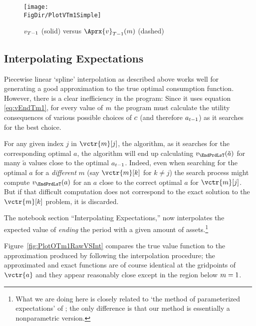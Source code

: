 \hypertarget{PlotvTm1Simple}{}
\begin{figure}
  \centerline{\texttt{[image: \\FigDir/PlotVTm1Simple]}}
  \caption{$v_{T-1}$ (solid) versus $\Aprx{\vFunc}_{\trmT-1}(\mNrm)$ (dashed)}
  \label{fig:PlotVTm1Simple}
\end{figure}


\hypertarget{interpolating-expectations}{}
\subsection{Interpolating Expectations}


Piecewise linear `spline' interpolation as described above works well for generating a good approximation to the true optimal consumption function. However, there is a clear inefficiency in the program: Since it uses equation \eqref{eq:vEndTm1}, for every value of $m$ the program must calculate the utility consequences of various possible choices of $c$ (and therefore $a_{t-1}$) as it searches for the best choice.

For any given index $j$ in $\vctr{m}[j]$, the algorithm, as it searches for the corresponding optimal $a$, the algorithm will end up  calculating $\vFunc_{\EndPrdLsT}(\tilde{a})$ for many $\tilde{a}$ values close to the optimal ${a}_{t-1}$.  Indeed, even when searching for the optimal ${a}$ for a \emph{different} ${m}$ (say $\vctr{m}[k]$ for $k \neq j$) the search process might compute $\vFunc_{\EndPrdLsT}({a})$ for an ${a}$ close to the correct optimal ${a}$ for $\vctr{m}[j]$. But if that difficult computation does not correspond to the exact solution to the $\vctr{m}[k]$ problem, it is discarded.  


The notebook section ``Interpolating Expectations,'' now interpolates the expected value of \textit{ending} the period with a given amount of assets.\footnote{What we are doing here is closely related to `the method of parameterized expectations' of \cite{denHaanMarcet:parameterized}; the only difference is that our method is essentially a nonparametric version.}  %

Figure~\ref{fig:PlotOTm1RawVSInt} compares the true value function to the approximation produced by following the interpolation procedure; the approximated and exact functions are of course identical at the gridpoints of $\vctr{a}$ and they appear reasonably close except in the region below $m=1$.

